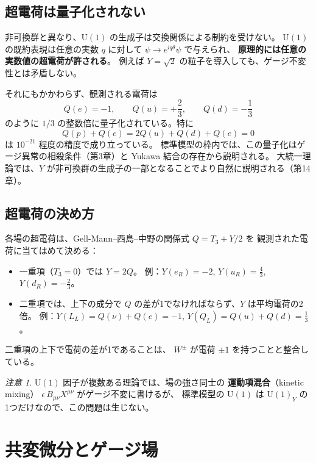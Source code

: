 \documentclass[uplatex,dvipdfmx,a4paper,11pt,openany]{jsbook}
\newcommand{\term}[2]{\textbf{#1}（#2）}
\numberwithin{equation}{chapter}
\theoremstyle{definition}
\theoremstyle{plain}
\theoremstyle{remark}
\newtheorem{remark}{注意}[chapter]
\newcommand{\U}{\mathrm{U}}
\begin{document}
\subsection{超電荷は量子化されない}
非可換群と異なり、$\U(1)$ の生成子は交換関係による制約を受けない。
$\U(1)$ の既約表現は任意の実数 $q$ に対して $\psi\to e^{iq\theta}\psi$ で与えられ、
\textbf{原理的には任意の実数値の超電荷が許される}。
例えば $Y=\sqrt2$ の粒子を導入しても、ゲージ不変性とは矛盾しない。

それにもかかわらず、観測される電荷は
\begin{equation}
Q(e)=-1,\qquad Q(u)=+\frac23,\qquad Q(d)=-\frac13
\end{equation}
のように $1/3$ の整数倍に量子化されている。特に
\begin{equation}
Q(p)+Q(e)=2Q(u)+Q(d)+Q(e)=0
\end{equation}
は $10^{-21}$ 程度の精度で成り立っている。
標準模型の枠内では、この量子化はゲージ異常の相殺条件（第3章）と
Yukawa 結合の存在から説明される。
大統一理論では、$Y$ が非可換群の生成子の一部となることでより自然に説明される（第14章）。
\subsection{超電荷の決め方}
各場の超電荷は、Gell-Mann--西島--中野の関係式 $Q=T_3+Y/2$ を
観測された電荷に当てはめて決める：
\begin{itemize}
    \item 一重項（$T_3=0$）では $Y=2Q$。
    例：$Y(e_R)=-2$, $Y(u_R)=\frac43$, $Y(d_R)=-\frac23$。
    \item 二重項では、上下の成分で $Q$ の差が1でなければならず、$Y$ は平均電荷の2倍。
    例：$Y(L_L)=Q(\nu)+Q(e)=-1$, $Y(Q_L)=Q(u)+Q(d)=\frac13$。
\end{itemize}
二重項の上下で電荷の差が1であることは、
$W^\pm$ が電荷 $\pm1$ を持つことと整合している。
\begin{remark}
$\U(1)$ 因子が複数ある理論では、場の強さ同士の
\term{運動項混合}{kinetic mixing} $\epsilon\,B_{\mu\nu}X^{\mu\nu}$ がゲージ不変に書けるが、
標準模型の $\U(1)$ は $\U(1)_Y$ の1つだけなので、この問題は生じない。
\end{remark}
\section{共変微分とゲージ場}
\end{document}
